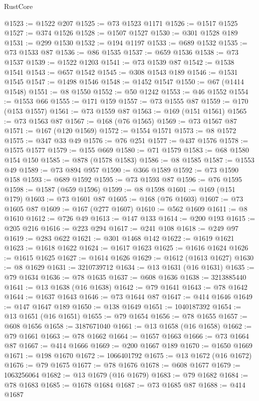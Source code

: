\begin{lexlean}{RustCore}
\begin{coremodule}
@1523 := @1522 @207
@1525 := @73 @1523 @1171
@1526 := @1517 @1525
@1527 := @374 @1526
@1528 := @1507 @1527
@1530 := @301 @1528 @189
@1531 := @299 @1530
@1532 := @194 @1197
@1533 := @689 @1532
@1535 := @73 @1533 @87
@1536 := @86 @1535
@1537 := @659 @1536
@1538 := @73 @1537
@1539 := @1522 @1203
@1541 := @73 @1539 @87
@1542 := @1538 @1541
@1543 := @657 @1542
@1545 := @308 @1543 @189
@1546 := @1531 @1545
@1547 := @1498 @1546
@1548 := @1452 @1547
@1550 := @67 (@1414 @1548)
@1551 := @8 @1550
@1552 := @50 @1242
@1553 := @46 @1552
@1554 := @1553 @66
@1555 := @171 @159
@1557 := @73 @1555 @87
@1559 := @170 (@153 @1557)
@1561 := @73 @1559 @87
@1563 := @169 (@151 @1561)
@1565 := @73 @1563 @87
@1567 := @168 (@76 @1565)
@1569 := @73 @1567 @87
@1571 := @167 (@120 @1569)
@1572 := @1554 @1571
@1573 := @8 @1572
@1575 := @347 @33 @49
@1576 := @76 @251
@1577 := @437 @1576
@1578 := @1575 @1577
@1579 := @155 @669
@1580 := @71 @1579
@1583 := @68 @1580 @154 @150
@1585 := @878 (@1578 @1583)
@1586 := @8 @1585
@1587 := @1553 @49
@1589 := @73 @894 @957
@1590 := @366 @1589
@1592 := @73 @1590 @158
@1593 := @689 @1592
@1595 := @73 @1593 @87
@1596 := @76 @1595
@1598 := @1587 (@659 @1596)
@1599 := @8 @1598
@1601 := @169 (@151 @179)
@1603 := @73 @1601 @87
@1605 := @168 (@76 @1603)
@1607 := @73 @1605 @87
@1609 := @167 (@277 @1607)
@1610 := @562 @1609
@1611 := @8 @1610
@1612 := @726 @49
@1613 := @147 @133
@1614 := @200 @193
@1615 := @205 @216
@1616 := @223 @294
@1617 := @241 @108
@1618 := @249 @97
@1619 := @283 @622
@1621 := @301 @1468 @142
@1622 := @1619 @1621
@1623 := @1618 @1622
@1624 := @1617 @1623
@1625 := @1616 @1624
@1626 := @1615 @1625
@1627 := @1614 @1626
@1629 := @1612 (@1613 @1627)
@1630 := @8 @1629
@1631 := 3210739712
@1634 := @13 @1631 (@16 @1631)
@1635 := @79 @1634
@1636 := @78 @1635
@1637 := @608 @1636
@1638 := 3213885440
@1641 := @13 @1638 (@16 @1638)
@1642 := @79 @1641
@1643 := @78 @1642
@1644 := @1637 @1643
@1646 := @73 @1644 @87
@1647 := @414 @1646
@1649 := @147 @1647 @189
@1650 := @138 @1649
@1651 := 1040187392
@1654 := @13 @1651 (@16 @1651)
@1655 := @79 @1654
@1656 := @78 @1655
@1657 := @608 @1656
@1658 := 3187671040
@1661 := @13 @1658 (@16 @1658)
@1662 := @79 @1661
@1663 := @78 @1662
@1664 := @1657 @1663
@1666 := @73 @1664 @87
@1667 := @414 @1666
@1669 := @200 @1667 @189
@1670 := @1650 @1669
@1671 := @198 @1670
@1672 := 1066401792
@1675 := @13 @1672 (@16 @1672)
@1676 := @79 @1675
@1677 := @78 @1676
@1678 := @608 @1677
@1679 := 1063256064
@1682 := @13 @1679 (@16 @1679)
@1683 := @79 @1682
@1684 := @78 @1683
@1685 := @1678 @1684
@1687 := @73 @1685 @87
@1688 := @414 @1687

\end{coremodule}
\end{lexlean}
